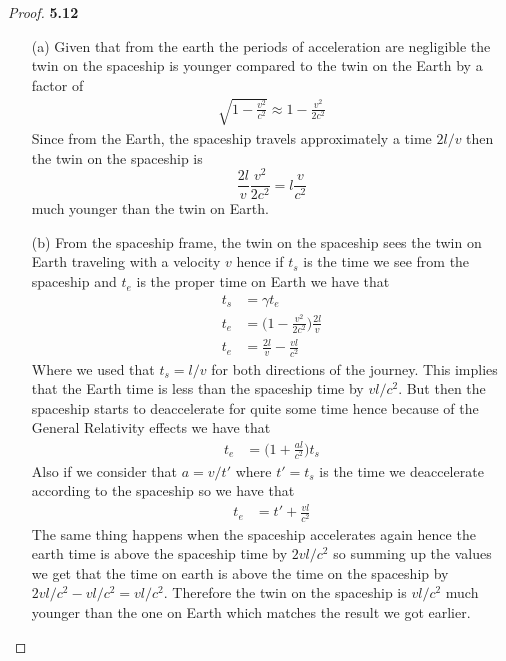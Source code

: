 \documentclass[11pt]{article}
\theoremstyle{definition}
\begin{document}
\begin{proof}{\textbf{5.12}}
\begin{itemize}
\item [(a)] Given that from the earth the periods of acceleration are
negligible the twin on the spaceship is younger compared to the twin on the
Earth by a factor of
\begin{align*}
    \sqrt{1 - \frac{v^2}{c^2}} \approx 1 - \frac{v^2}{2c^2} 
\end{align*}
Since from the Earth, the spaceship travels approximately a time $2l/v$
then the twin on the spaceship is
$$ \frac{2l}{v}\frac{v^2}{2c^2} = l \frac{v}{c^2}$$
much younger than the twin on Earth.

\item [(b)] From the spaceship frame, the twin on the spaceship sees the
twin on Earth traveling with a velocity $v$ hence if $t_s$ is the time we see
from the spaceship and $t_e$ is the proper time on Earth we have that 
\begin{align*}
    t_{s} &= \gamma t_e\\
    t_e &= \bigg(1 - \frac{v^2}{2c^2}\bigg) \frac{2l}{v}\\
    t_e &= \frac{2l}{v} - \frac{vl}{c^2}
\end{align*}
Where we used that $t_s = l/v$ for both directions of the journey.
This implies that the Earth time is less than the spaceship time by 
$vl/c^2$. But then the spaceship starts to deaccelerate for quite some time
hence because of the General Relativity effects we have that
\begin{align*}
    t_{e} &= \bigg(1 + \frac{al}{c^2}\bigg)t_s
\end{align*}
Also if we consider that $a = v/t'$ where $t' = t_s$ is the time we
deaccelerate according to the spaceship so we have that
\begin{align*}
    t_{e} &= t' + \frac{vl}{c^2}
\end{align*}
The same thing happens when the spaceship accelerates again hence the
earth time is above the spaceship time by $2vl/c^2$ so summing up the values
we get that the time on earth is above the time on the spaceship by
$2vl/c^2 - vl/c^2 = vl/c^2$. Therefore the twin on the spaceship is $vl/c^2$
much younger than the one on Earth which matches the result we got
earlier. 



\end{itemize}
\end{proof}
\end{document}
